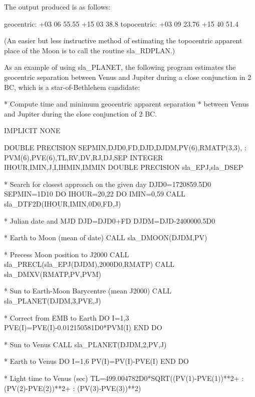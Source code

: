 \documentclass[11pt,twoside,nolof]{starlink}
\begin{document}
\goodbreak
The output produced is as follows:
\goodbreak
\begin{terminalv}
       geocentric:  +03 06 55.55 +15 03 38.8
      topocentric:  +03 09 23.76 +15 40 51.4
\end{terminalv}
\goodbreak
(An easier but
less instructive method of estimating the topocentric apparent place of the
Moon is to call the routine
sla\_RDPLAN.)

As an example of using
sla\_PLANET,
the following program estimates the geocentric separation
between Venus and Jupiter during a close conjunction
in 2\,BC, which is a star-of-Bethlehem candidate:
\goodbreak
\begin{terminalv}
      *  Compute time and minimum geocentric apparent separation
      *  between Venus and Jupiter during the close conjunction of 2 BC.

            IMPLICIT NONE

            DOUBLE PRECISION SEPMIN,DJD0,FD,DJD,DJDM,PV(6),RMATP(3,3),
           :                 PVM(6),PVE(6),TL,RV,DV,RJ,DJ,SEP
            INTEGER IHOUR,IMIN,J,I,IHMIN,IMMIN
            DOUBLE PRECISION sla_EPJ,sla_DSEP


      *  Search for closest approach on the given day
            DJD0=1720859.5D0
            SEPMIN=1D10
            DO IHOUR=20,22
               DO IMIN=0,59
                  CALL sla_DTF2D(IHOUR,IMIN,0D0,FD,J)

      *        Julian date and MJD
                  DJD=DJD0+FD
                  DJDM=DJD-2400000.5D0

      *        Earth to Moon (mean of date)
                  CALL sla_DMOON(DJDM,PV)

      *        Precess Moon position to J2000
                  CALL sla_PRECL(sla_EPJ(DJDM),2000D0,RMATP)
                  CALL sla_DMXV(RMATP,PV,PVM)

      *        Sun to Earth-Moon Barycentre (mean J2000)
                  CALL sla_PLANET(DJDM,3,PVE,J)

      *        Correct from EMB to Earth
                  DO I=1,3
                     PVE(I)=PVE(I)-0.012150581D0*PVM(I)
                  END DO

      *        Sun to Venus
                  CALL sla_PLANET(DJDM,2,PV,J)

      *        Earth to Venus
                  DO I=1,6
                     PV(I)=PV(I)-PVE(I)
                  END DO

      *        Light time to Venus (sec)
                  TL=499.004782D0*SQRT((PV(1)-PVE(1))**2+
           :                           (PV(2)-PVE(2))**2+
           :                           (PV(3)-PVE(3))**2)


\end{terminalv}
\end{document}
